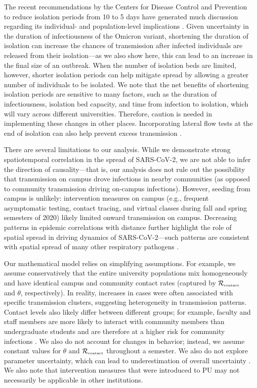 \documentclass[12pt]{article}
\newcommand{\Rx}[1]{\ensuremath{{\mathcal R}_{#1}}}
\newcommand{\Rc}{\Rx{\textrm{\tiny{contact}}}}
\begin{document}
The recent recommendations by the Centers for Disease Control and Prevention to reduce isolation periods from 10 to 5 days \citep{cdcisolation} have generated much discussion regarding its individual- and population-level implications \citep{soljak2022reducing}.
Given uncertainty in the duration of infectiousness of the Omicron variant, shortening the duration of isolation can increase the chances of transmission after infected individuals are released from their isolation---as we also show here, this can lead to an increase in the final size of an outbreak.
When the number of isolation beds are limited, however, shorter isolation periods can help mitigate spread by allowing a greater number of individuals to be isolated.
We note that the net benefits of shortening isolation periods are sensitive to many factors, such as the duration of infectiousness, isolation bed capacity, and time from infection to isolation, which will vary across different universities.
Therefore, caution is needed in implementing these changes in other places.
Incorporating lateral flow tests at the end of isolation can also help prevent excess transmission \citep{quilty2022test}.

There are several limitations to our analysis.
While we demonstrate strong spatiotemporal correlation in the spread of SARS-CoV-2, we are not able to infer the direction of causality---that is, our analysis does not rule out the possibility that transmission on campus drove infections in nearby communities (as opposed to community transmission driving on-campus infections).
However, seeding from campus is unlikely: 
intervention measures on campus (e.g., frequent asymptomatic testing, contact tracing, and virtual classes during fall and spring semesters of 2020) likely limited onward transmission on campus.
Decreasing patterns in epidemic correlations with distance further highlight the role of spatial spread in driving dynamics of SARS-CoV-2---such patterns are consistent with spatial spread of many other respiratory pathogens \citep{grenfell2001travelling, viboud2006synchrony, baker2019epidemic}.

Our mathematical model relies on simplifying assumptions.
For example, we assume conservatively that the entire university populations mix homogeneously and have identical campus and community contact rates (captured by $\Rc$ and $\theta$, respectively).
In reality, increases in cases were often associated with specific transmission clusters, suggesting heterogeneity in transmission patterns.
Contact levels also likely differ between different groups;
for example, faculty and staff members are more likely to interact with community members than undergraduate students and are therefore at a higher risk for community infections \citep{frazier2022modeling}.
We also do not account for changes in behavior; 
instead, we assume constant values for $\theta$ and $\Rc$ throughout a semester.
We also do not explore parameter uncertainty, which can lead to underestimation of overall uncertainty \citep{elderd2006uncertainty}. 
We also note that intervention measures that were introduced to PU may not necessarily be applicable in other institutions.
\end{document}
